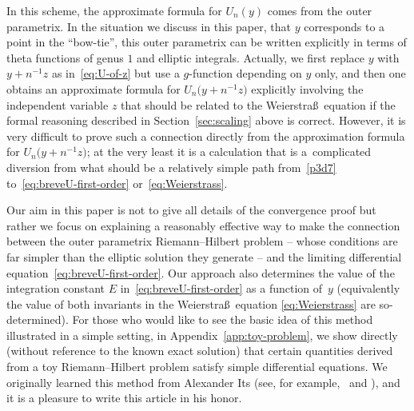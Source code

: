 \documentclass[pdftex]{sigma}
\numberwithin{equation}{section}
\begin{document}
In this scheme, the approximate formula for $U_n(y)$ comes from the outer parametrix.
In the situation we discuss in this paper, that $y$ corresponds to a point in the
``bow-tie'', this outer parametrix can be written explicitly in terms of theta
functions of genus $1$ and elliptic integrals. Actually, we first replace $y$ with
$y+n^{-1}z$ as in~\eqref{eq:U-of-z} but use a $g$-function depending on $y$ only, and
then one obtains an approximate formula for $U_n\bigl(y+n^{-1}z\bigr)$ explicitly involving the
independent variable $z$ that should be related to the Weierstra\ss\ equation if the
formal reasoning described in Section~\ref{sec:scaling} above is correct. However,
it is very difficult to prove such a connection directly from the approximation
formula for $U_n\bigl(y+n^{-1}z\bigr)$; at the very least it is a calculation that is a~complicated
diversion from what should be a relatively simple path from~\eqref{p3d7}
to~\eqref{eq:breveU-first-order} or~\eqref{eq:Weierstrass}.

Our aim in this paper is not to give all details of the convergence proof but rather
we focus on explaining a reasonably effective way to make the connection between the
outer parametrix Riemann--Hilbert problem -- whose conditions are far simpler than
the elliptic solution they generate -- and the limiting differential equation~\eqref{eq:breveU-first-order}. Our approach also determines the value of the
integration constant $E$ in~\eqref{eq:breveU-first-order} as a function of~$y$
(equivalently the value of both invariants in the Weierstra\ss\ equation
\eqref{eq:Weierstrass} are so-determined).
For those who would like to see the basic idea of this method illustrated
in a simple setting, in Appendix~\ref{app:toy-problem}, we show directly (without
reference to the known exact solution) that certain quantities derived from
a toy Riemann--Hilbert problem satisfy simple differential equations.
We originally learned this method from
Alexander Its (see, for example,~\cite[Chapter~8]{FokasIKN:2006} and
\cite{ItsK:2002}),
and it is a pleasure to write this article in his honor.
\end{document}
